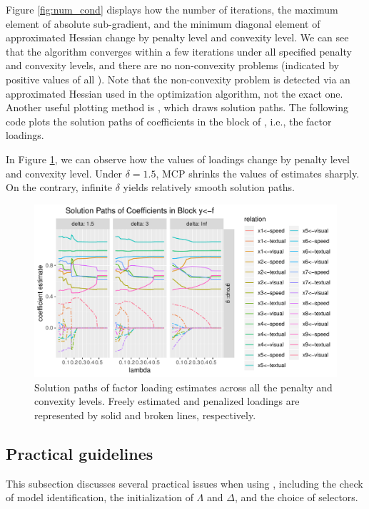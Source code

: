 \documentclass[nojss]{jss}
\begin{document}
Figure \ref{fig:num_cond} displays how the number of iterations, the maximum element of absolute sub-gradient, and the minimum diagonal element of approximated Hessian change by penalty level and convexity level. We can see that the algorithm converges within a few iterations under all specified penalty and convexity levels, and there are no non-convexity problems (indicated by positive values of all ). Note that the non-convexity problem is detected via an approximated Hessian used in the optimization algorithm, not the exact one. Another useful plotting method is , which draws solution paths. The following code plots the solution paths of coefficients in the block of , i.e., the factor loadings. 
\begin{Schunk}
\end{Schunk}
In Figure \ref{fig:solution_path}, we can observe how the values of loadings change by penalty level and convexity level. Under $$, MCP shrinks the values of estimates sharply. On the contrary, infinite $\delta$ yields relatively smooth solution paths. 

\begin{figure}[t!]
\centering
\includegraphics{vignette-lslx-014}
\caption{\label{fig:solution_path}Solution paths of factor loading estimates across all the penalty and convexity levels. Freely estimated and penalized loadings are represented by solid and broken lines, respectively.}
\end{figure}

\subsection{Practical guidelines} \label{sec:lslx_guide}
This subsection discusses several practical issues when using , including the check of model identification, the initialization of $\Lambda$ and $\Delta$, and the choice of selectors.
\end{document}
